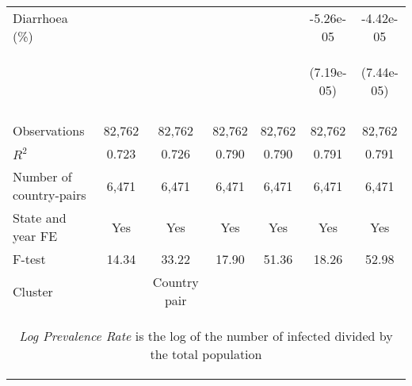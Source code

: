 \documentclass{article}
\begin{document}
\begin{table}[htbp]
{\begin{tabular}{lcccccc}
Diarrhoea (\%) &  &  &  &  & -5.26e-05 & -4.42e-05 \\
\vspace{4pt} & \begin{footnotesize}\end{footnotesize} & \begin{footnotesize}\end{footnotesize} & \begin{footnotesize}\end{footnotesize} & \begin{footnotesize}\end{footnotesize} & \begin{footnotesize}(7.19e-05)\end{footnotesize} & \begin{footnotesize}(7.44e-05)\end{footnotesize} \\
\vspace{4pt} & \begin{footnotesize}\end{footnotesize} & \begin{footnotesize}\end{footnotesize} & \begin{footnotesize}\end{footnotesize} & \begin{footnotesize}\end{footnotesize} & \begin{footnotesize}\end{footnotesize} & \begin{footnotesize}\end{footnotesize} \\
Observations & 82,762 & 82,762 & 82,762 & 82,762 & 82,762 & 82,762 \\
$R^2$ & 0.723 & 0.726 & 0.790 & 0.790 & 0.791 & 0.791 \\
Number of country-pairs & 6,471 & 6,471 & 6,471 & 6,471 & 6,471 & 6,471 \\
State and year FE & Yes & Yes & Yes & Yes & Yes & Yes \\
F-test & 14.34 & 33.22 & 17.90 & 51.36 & 18.26 & 52.98 \\
Cluster & & \multicolumn{1}{c}{Country pair} \\ \hline
\multicolumn{7}{c}{\begin{footnotesize} \textit{Log Prevalence Rate} is the log of the number of infected divided by the total population \end{footnotesize} }\\

\end{tabular}}
\end{table}
\end{document}

